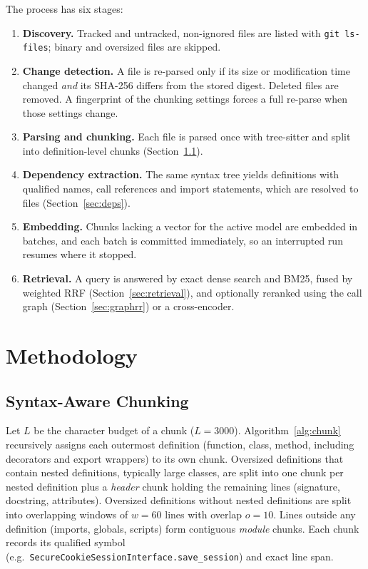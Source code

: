 \documentclass[conference]{IEEEtran}
\begin{document}
The process has six stages:
\begin{enumerate}
  \item \textbf{Discovery.} Tracked and untracked, non-ignored files are listed
        with \texttt{git ls-files}; binary and oversized files are skipped.
  \item \textbf{Change detection.} A file is re-parsed only if its size or
        modification time changed \emph{and} its SHA-256 differs from the stored
        digest. Deleted files are removed. A fingerprint of the chunking settings
        forces a full re-parse when those settings change.
  \item \textbf{Parsing and chunking.} Each file is parsed once with
        tree-sitter and split into definition-level chunks (Section~\ref{sec:chunking}).
  \item \textbf{Dependency extraction.} The same syntax tree yields definitions
        with qualified names, call references and import statements, which are
        resolved to files (Section~\ref{sec:deps}).
  \item \textbf{Embedding.} Chunks lacking a vector for the active model are
        embedded in batches, and each batch is committed immediately, so an
        interrupted run resumes where it stopped.
  \item \textbf{Retrieval.} A query is answered by exact dense search and BM25,
        fused by weighted RRF (Section~\ref{sec:retrieval}), and optionally
        reranked using the call graph (Section~\ref{sec:graphrr}) or a
        cross-encoder.
\end{enumerate}

\section{Methodology}

\subsection{Syntax-Aware Chunking}\label{sec:chunking}
Let $L$ be the character budget of a chunk ($L = 3000$). Algorithm~\ref{alg:chunk}
recursively assigns each outermost definition (function, class, method,
including decorators and export wrappers) to its own chunk. Oversized
definitions that contain nested definitions, typically large classes, are split
into one chunk per nested definition plus a \emph{header} chunk holding the
remaining lines (signature, docstring, attributes). Oversized definitions without
nested definitions are split into overlapping windows of $w = 60$ lines with
overlap $o = 10$. Lines outside any definition (imports, globals, scripts)
form contiguous \emph{module} chunks. Each chunk records its qualified symbol
(e.g.\ \texttt{SecureCookieSession\-Interface.save\_session}) and exact line span.
\end{document}
